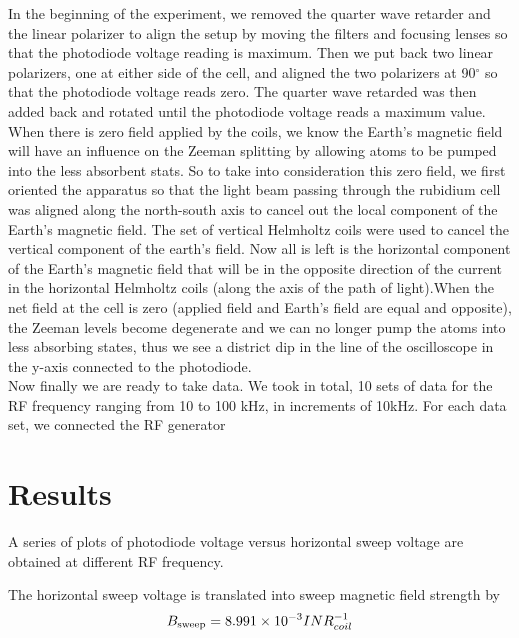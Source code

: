 \documentclass[prb,preprint]{revtex4-1}
\begin{document}
In the beginning of the experiment, we removed the quarter wave retarder and the linear polarizer to align the setup by moving the filters and focusing lenses so that the photodiode voltage reading is maximum. Then we put back two linear polarizers, one at either side of the cell, and aligned the two polarizers at 90$^{\circ}$ so that the photodiode voltage reads zero. The quarter wave retarded was then added back and rotated until the photodiode voltage reads a maximum value.\\

When there is zero field applied by the coils, we know the Earth's magnetic field will have an influence on the Zeeman splitting by allowing atoms to be pumped into the less absorbent stats. So to take into consideration this zero field, we first oriented the apparatus so that the light beam passing through the rubidium cell was aligned along the north-south axis to cancel out the local component of the Earth's magnetic field. The set of vertical Helmholtz coils were used to cancel the vertical component of the earth's field. Now all is left is the horizontal component of the Earth's magnetic field that will be in the opposite direction of the current in the horizontal Helmholtz coils (along the axis of the path of light).When the net field at the cell is zero (applied field and Earth's field are equal and opposite), the Zeeman levels become degenerate and we can no longer pump the atoms into less absorbing states, thus we see a district dip in the line of the oscilloscope in the y-axis connected to the photodiode.\\

Now finally we are ready to take data. We took in total, 10 sets of data for the RF frequency ranging from 10 to 100 kHz, in increments of 10kHz. For each data set, we connected the RF generator


\section{Results}

A series of plots of photodiode voltage versus horizontal sweep voltage are obtained at different RF frequency. 

The horizontal sweep voltage is translated into sweep magnetic field strength by
\begin{equation}
B_{\textnormal{sweep}}=8.991\times10^{-3} I N R_{coil}^{-1}
\label{vtob}
\end{equation}
\end{document}
